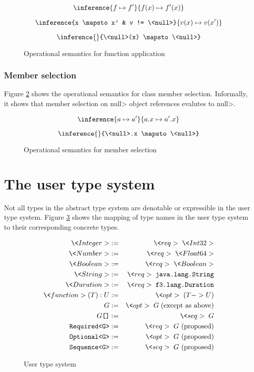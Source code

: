 \documentclass{article}
\newcommand{\req}{\<req>\;}
\newcommand{\opt}{\<opt>\;}
\newcommand{\seq}{\<seq>\;}
\newcommand{\sqb}{\texttt{[]}}
\begin{document}
\begin{figure}[htpb]
\[ \inference{f \mapsto f'}{f(x) \mapsto f'(x)} \]

\[ \inference{x \mapsto x' & v != \<null>}{v(x) \mapsto v(x')} \]

\[ \inference{}{\<null>(x) \mapsto \<null>} \]
\caption{Operational semantics for function application}
\label{function-semantics}
\end{figure}

\subsubsection{Member selection}

Figure \ref{member-semantics} shows the operational semantics for
class member selection.  Informally, it shows that member selection on
\<null> object references evalutes to \<null>.

\begin{figure}[htpb]
\[ \inference{a \mapsto a'}{a.x \mapsto a'.x} \]

\[ \inference{}{\<null>.x \mapsto \<null>} \]
\caption{Operational semantics for member selection}
\label{member-semantics}
\end{figure}


\section{The user type system}

Not all types in the abstract type system are denotable or expressible
in the user type system.  Figure \ref{user-types} shows the mapping of
type names in the user type system to their corresponding concrete
types.  

\begin{figure}[htpb]
\begin{eqnarray*}
  \<Integer> &:=& \req \<Int32> \\
  \<Number> &:=& \req \<Float64> \\
  \<Boolean> &:=& \req \<Boolean> \\
  \<String> &:=& \req \texttt{java.lang.String} \\
  \<Duration> &:=& \req \texttt{f3.lang.Duration} \\
  \<function>(T) : U &:=& \opt (T -> U) \\
  G &:=& \opt G \;(\textrm{except as above}) \\
  G\sqb &:=& \seq G \\
  \texttt{Required<G>} &:=& \req G \textrm{ (proposed)}\\
  \texttt{Optional<G>} &:=& \opt G \textrm{ (proposed)}\\
  \texttt{Sequence<G>} &:=& \seq G \textrm{ (proposed)}\\
\end{eqnarray*}

\caption{User type system}
\label{user-types}
\end{figure}
\end{document}
